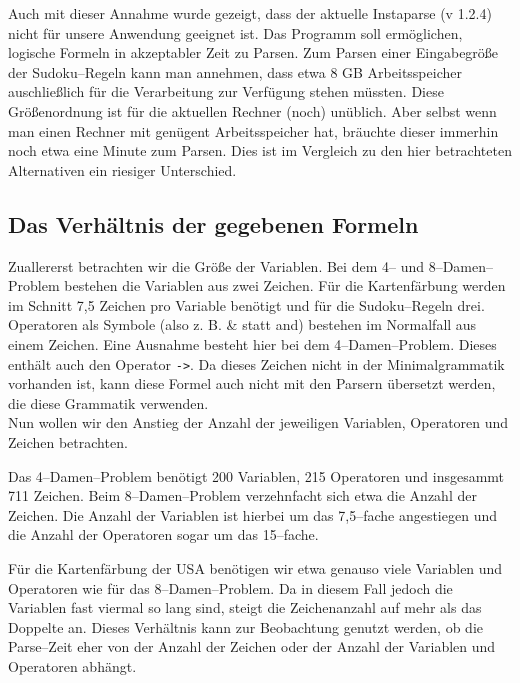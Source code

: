 \documentclass[ngerman,a4paper,abstracton,open=right,twoside=false,toc=listofnumbered,bibtotocnumbered]{scrreprt}
\begin{document}
Auch mit dieser Annahme wurde gezeigt, dass der aktuelle Instaparse (v 1.2.4) nicht für unsere Anwendung geeignet ist. Das Programm soll ermöglichen, logische Formeln in akzeptabler Zeit zu Parsen. Zum Parsen einer Eingabegröße der Sudoku--Regeln kann man annehmen, dass etwa 8 GB Arbeitsspeicher auschließlich für die Verarbeitung zur Verfügung stehen müssten. Diese Größenordnung ist für die aktuellen Rechner (noch) unüblich. Aber selbst wenn man einen Rechner mit genügent Arbeitsspeicher hat, bräuchte dieser immerhin noch etwa eine Minute zum Parsen. Dies ist im Vergleich zu den hier betrachteten Alternativen ein riesiger Unterschied.

\subsection{Das Verhältnis der gegebenen Formeln}

Zuallererst betrachten wir die Größe der Variablen. Bei dem 4-- und 8--Damen--Problem bestehen die Variablen aus zwei Zeichen. Für die Kartenfärbung werden im Schnitt 7,5 Zeichen pro Variable benötigt und für die Sudoku--Regeln drei.\\

Operatoren als Symbole (also z. B. \glqq{}\&\grqq{} statt \glqq{}and\grqq{}) bestehen im Normalfall aus einem Zeichen. Eine Ausnahme besteht hier bei dem 4--Damen--Problem. Dieses enthält auch den Operator \lstinline|->|. Da dieses Zeichen nicht in der Minimalgrammatik vorhanden ist, kann diese Formel auch nicht mit den Parsern übersetzt werden, die diese Grammatik verwenden.\\

Nun wollen wir den Anstieg der Anzahl der jeweiligen Variablen, Operatoren und Zeichen betrachten.

Das 4--Damen--Problem benötigt 200 Variablen, 215 Operatoren und insgesammt 711 Zeichen. Beim 8--Damen--Problem verzehnfacht sich etwa die Anzahl der Zeichen. Die Anzahl der Variablen ist hierbei um das 7,5--fache angestiegen und die Anzahl der Operatoren sogar um das 15--fache.

Für die Kartenfärbung der USA benötigen wir etwa genauso viele Variablen und Operatoren wie für das 8--Damen--Problem. Da in diesem Fall jedoch die Variablen fast viermal so lang sind, steigt die Zeichenanzahl auf mehr als das Doppelte an. Dieses Verhältnis kann zur Beobachtung genutzt werden, ob die Parse--Zeit eher von der Anzahl der Zeichen oder der Anzahl der Variablen und Operatoren abhängt.
\end{document}
